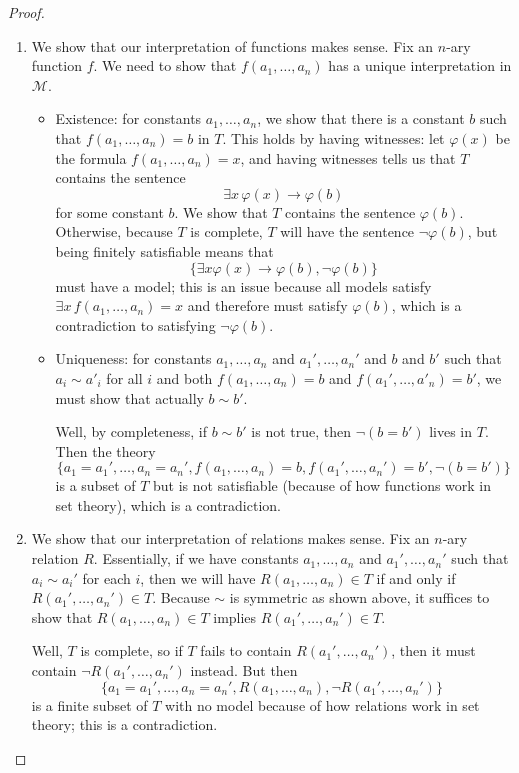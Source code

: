 \documentclass[../notes.tex]{subfiles}
\begin{document}
\begin{proof}
\begin{enumerate}
		\item We show that our interpretation of functions makes sense. Fix an $n$-ary function $f$. We need to show that $f(a_1,\ldots,a_n)$ has a unique interpretation in $\mathcal M$.
		\begin{itemize}
			\item Existence: for constants $a_1,\ldots,a_n$, we show that there is a constant $b$ such that $f(a_1,\ldots,a_n)=b$ in $T$. This holds by having witnesses: let $\varphi(x)$ be the formula $f(a_1,\ldots,a_n)=x$, and having witnesses tells us that $T$ contains the sentence
			\[\exists x\,\varphi(x)\to\varphi(b)\]
			for some constant $b$. We show that $T$ contains the sentence $\varphi(b)$. Otherwise, because $T$ is complete, $T$ will have the sentence $\lnot\varphi(b)$, but being finitely satisfiable means that
			\[\{\exists x\varphi(x)\to\varphi(b),\lnot\varphi(b)\}\]
			must have a model; this is an issue because all models satisfy $\exists x\,f(a_1,\ldots,a_n)=x$ and therefore must satisfy $\varphi(b)$, which is a contradiction to satisfying $\lnot\varphi(b)$.
			\item Uniqueness: for constants $a_1,\ldots,a_n$ and $a_1',\ldots,a_n'$ and $b$ and $b'$ such that $a_i\sim a'_i$ for all $i$ and both $f(a_1,\ldots,a_n)=b$ and $f(a_1',\ldots,a'_n)=b'$, we must show that actually $b\sim b'$.

			Well, by completeness, if $b\sim b'$ is not true, then $\lnot(b=b')$ lives in $T$. Then the theory
			\[\{a_1=a_1',\ldots,a_n=a_n',f(a_1,\ldots,a_n)=b,f(a_1',\ldots,a_n')=b',\lnot(b=b')\}\]
			is a subset of $T$ but is not satisfiable (because of how functions work in set theory), which is a contradiction. 
		\end{itemize}

		\item We show that our interpretation of relations makes sense. Fix an $n$-ary relation $R$. Essentially, if we have constants $a_1,\ldots,a_n$ and $a_1',\ldots,a_n'$ such that $a_i\sim a_i'$ for each $i$, then we will have $R(a_1,\ldots,a_n)\in T$ if and only if $R(a_1',\ldots,a_n')\in T$. Because $\sim$ is symmetric as shown above, it suffices to show that $R(a_1,\ldots,a_n)\in T$ implies $R(a_1',\ldots,a_n')\in T$.

		Well, $T$ is complete, so if $T$ fails to contain $R(a_1',\ldots,a_n')$, then it must contain $\lnot R(a_1',\ldots,a_n')$ instead. But then
		\[\{a_1=a_1',\ldots,a_n=a_n',R(a_1,\ldots,a_n),\lnot R(a_1',\ldots,a_n')\}\]
		is a finite subset of $T$ with no model because of how relations work in set theory; this is a contradiction.


\end{enumerate}
\end{proof}
\end{document}
